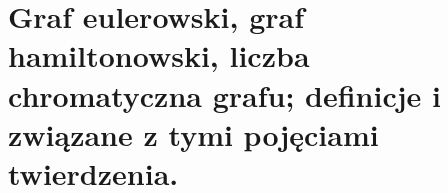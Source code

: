 \section{Graf eulerowski, graf hamiltonowski, liczba chromatyczna grafu; definicje i związane z tymi pojęciami twierdzenia.}
